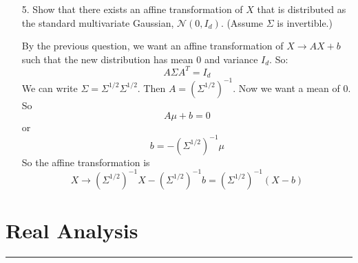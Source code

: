 \documentclass{article}
\begin{document}
\begin{itemize}
            \item [5.] Show that there exists an affine transformation of $X$ that is distributed as the standard multivariate Gaussian, $\mathcal{N}(0, I_{d})$. (Assume $\Sigma$ is invertible.) 
                \begin{answer}
                    By the previous question, we want an affine transformation of $X \rightarrow AX + b$ such that the new distribution has mean $0$ and variance $I_{d}$. So:
                        \begin{equation*}
                            A\Sigma A^{T} = I_{d}
                        \end{equation*}
                    We can write $\Sigma = \Sigma^{1/2}\Sigma^{1/2}$. Then $A = (\Sigma^{1/2})^{-1}$. Now we want a mean of $0$. So
                        \begin{equation*}
                            A\mu + b = 0
                        \end{equation*}
                    or
                        \begin{equation*}
                            b = -(\Sigma^{1/2})^{-1}\mu
                        \end{equation*}
                    So the affine transformation is
                        \begin{equation*}
                            X \rightarrow (\Sigma^{1/2})^{-1}X - (\Sigma^{1/2})^{-1}b = (\Sigma^{1/2})^{-1}(X - b)
                        \end{equation*}
                \end{answer}
        \end{itemize}

    \newpage
    \section*{Real Analysis}
    \hrule
\end{document}
